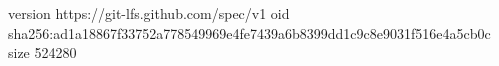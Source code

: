 version https://git-lfs.github.com/spec/v1
oid sha256:ad1a18867f33752a778549969e4fe7439a6b8399dd1c9c8e9031f516e4a5cb0c
size 524280
